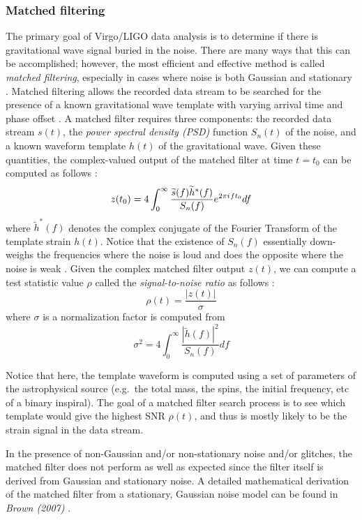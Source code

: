 \documentclass[preprint,
letterpaper,
 amsmath,amssymb,
 aps,
]{revtex4-2}
\newcommand{\iu}{{i\mkern1mu}}
\begin{document}
\subsubsection{Matched filtering}
The primary goal of Virgo/LIGO data analysis is to determine if there is gravitational wave signal buried in the noise. There are many ways that this can be accomplished; however, the most efficient and effective method is called \textit{matched filtering}, especially in cases where noise is both Gaussian and stationary \cite{helstrom_1975}. Matched filtering allows the recorded data stream to be searched for the presence of a known gravitational wave template with varying arrival time and phase offset \cite{surf}.  A matched filter requires three components: the recorded data stream $s(t)$, the \textit{power spectral density (PSD)} function $S_n(t)$ of the noise, and a known waveform template $h(t)$ of the gravitational wave. Given these quantities, the complex-valued output of the matched filter at time $t=t_0$ can be computed as follows \cite{findchirp}:
\begin{equation}
    z(t_0) = 4\int_0^\infty\frac{\widetilde{s}(f)\widetilde{h}^*(f)}{S_n(f)}e^{2\pi\iu ft_0}df
\end{equation}
where $\widetilde{h}^*(f)$ denotes the complex conjugate of the Fourier Transform of the template strain $h(t)$. Notice that the existence of $S_n(f)$ essentially down-weighs the frequencies where the noise is loud and does the opposite where the noise is weak \cite{ultimate}. Given the complex matched filter output $z(t)$, we can compute a test statistic value $\rho$ called the \textit{signal-to-noise ratio} as follows \cite{findchirp}: 
\begin{equation}
   \rho (t) = \frac{|z(t)|}{\sigma}
\end{equation}
where $\sigma$ is a normalization factor is computed from \cite{findchirp}
\begin{equation}
   \sigma^2 =  4\int_0^\infty\frac{|\widetilde{h}(f)|^2}{S_n(f)}df
\end{equation}

 Notice that here, the template waveform is computed using a set of parameters of the astrophysical source (e.g.\ the total mass, the spins, the initial frequency, etc of a binary inspiral). The goal of a matched filter search process is to see which template would give the highest SNR $\rho (t)$, and thus is mostly likely to be the strain signal in the data stream. 
 
In the presence of non-Gaussian and/or non-stationary noise and/or glitches, the matched filter does not perform as well as expected since the filter itself is derived from Gaussian and stationary noise. A detailed mathematical derivation of the matched filter from a stationary, Gaussian noise model can be found in \textit{Brown (2007)} \cite{brown2007searching}.
\end{document}
